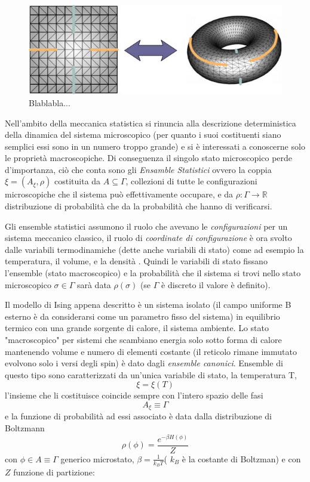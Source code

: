 \documentclass[11pt]{article}
\theoremstyle{plain}
\begin{document}
\begin{itemize}
\begin{figure}
\centering

\includegraphics[scale=0.5]{Immagini/bordoperiodico.jpg}

\caption{Blablabla...}\label{fig:2}

\end{figure}


\end{itemize}

Nell'ambito della meccanica statistica si rinuncia alla descrizione deterministica della dinamica del sistema microscopico (per quanto i suoi costituenti siano semplici essi sono in un numero troppo grande) e si è interessati a conoscerne solo le proprietà macroscopiche.
Di conseguenza il singolo stato microscopico perde d'importanza, ciò che conta sono gli \emph{Ensamble Statistici} ovvero la coppia $\xi = (A_{\xi},\rho)$ costituita da $A\subseteq \Gamma$, collezioni di tutte le configurazioni microscopiche che il sistema può effettivamente occupare, e da $\rho:\Gamma \rightarrow \mathbb{R}$ distribuzione di probabilità che da la probabilità che hanno di verificarsi.

Gli ensemble statistici assumono il ruolo che avevano le \emph{configurazioni} per  un sistema meccanico classico, il ruolo di \emph{coordinate di configurazione} è ora svolto dalle variabili termodinamiche (dette anche variabili di stato) come ad esempio la temperatura, il volume, e la densità . 
Quindi le variabili di stato fissano l'ensemble (stato macroscopico) e la probabilità che il sistema si trovi nello stato microscopico $\sigma \in \Gamma$ sarà data $\rho(\sigma)$ (se $\Gamma$ è discreto il valore è definito).
\medskip

Il modello di Ising appena descritto è un sistema isolato (il campo uniforme B esterno è da considerarsi come un parametro fisso del sistema) in equilibrio termico con una grande sorgente di calore, il sistema ambiente.
Lo stato "macroscopico" per sistemi che scambiano energia solo sotto forma di calore mantenendo volume e numero di elementi costante (il reticolo rimane immutato evolvono solo i versi degli spin) è dato dagli \emph{ensemble canonici}. 
Ensemble di questo tipo sono caratterizzati da un'unica variabile di stato, la temperatura T, $$\xi = \xi(T)$$
l'insieme che li costituisce coincide sempre con l'intero spazio delle fasi $$A_{\xi}\equiv \Gamma$$
e la funzione di probabilità ad essi associato è data dalla distribuzione di Boltzmann
$$\rho(\phi) = \frac{e^{-\beta H(\phi)}}{Z} $$
con $\phi \in A\equiv \Gamma$ generico microstato, $\beta = \frac{1}{k_{B}T} $( $k_B$ è la costante di Boltzman) e con $Z$ funzione di partizione: 
\end{document}
